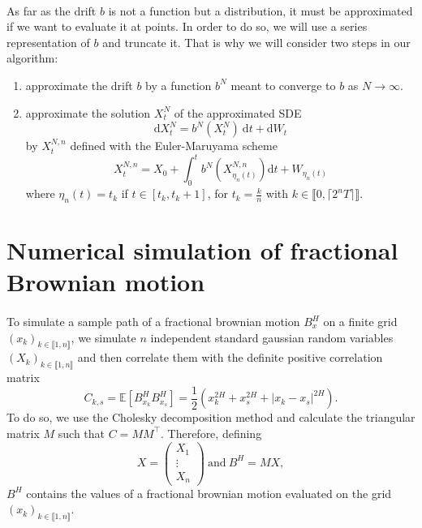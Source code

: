 \documentclass{article}[12pt]
\newcommand{\E}{\mathbb{E}}
\newcommand{\di}{\mathrm{d}}
\begin{document}
    \paragraph{}
    As far as the drift $b$ is not a function but a distribution, it must be approximated if we want to evaluate it at points. In order to do so, we will use a series representation of $b$ and truncate it. That is why we will consider two steps in our algorithm: \begin{enumerate}
        \item approximate the drift $b$ by a function $b^N$ meant to converge to $b$ as $N\rightarrow\infty$.
        \item approximate the solution $X^N_t$ of the approximated SDE
        \begin{equation} \label{sde2}
        \di X^N_t = b^N\left(X^N_t\right)\ \di t + \di W_t
        \end{equation} 
        by $X^{N,n}_t$ defined with the Euler-Maruyama scheme
        \begin{equation*}
        X^{N,n}_t = X_0 + \int_0^t b^N\left(X^{N,n}_{\eta_n(t)}\right)\di t + W_{\eta_n(t)}
        \end{equation*}
        where $\eta_n(t)=t_k$ if $t\in[t_k,t_k+1]$, for $t_k=\frac{k}{n}$ with $ k\in\llbracket0,\lceil2^nT\rceil\rrbracket$.
        
    \end{enumerate}

\section{Numerical simulation of fractional Brownian motion}    
    \paragraph{}
    To simulate a sample path of a fractional brownian motion $B^H_x$ on a finite grid $(x_k)_{k\in\llbracket1,n\rrbracket}$, we simulate $n$ independent standard gaussian random variables $(X_k)_{k\in\llbracket1,n\rrbracket}$ and then correlate them with the definite positive correlation matrix 
    $$C_{k,s}=\E\left[B_{x_k}^HB_{x_s}^H\right]=\frac{1}{2}\left(x_k^{2H}+x_s^{2H}+|x_k-x_s|^{2H}\right).$$
    To do so, we use the Cholesky decomposition method and calculate the triangular matrix $M$ such that $C=MM^\top$. Therefore, defining
    $$X = \begin{pmatrix}
    X_1 \\ \vdots \\ X_n
    \end{pmatrix}\ \mathrm{and}\ B^H = MX,$$
    $B^H$ contains the values of a fractional brownian motion evaluated on the grid $(x_k)_{k\in\llbracket1,n\rrbracket}$.
    
\end{document}
